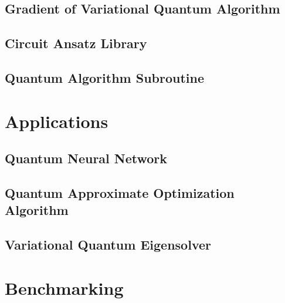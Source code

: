 \documentclass[pra,twocolumn,superscriptaddress,floatfix,nofootinbib,amsmath,amssymb]{revtex4-1}
\numberwithin{equation}{section}
\numberwithin{figure}{section}
\numberwithin{table}{section}
\begin{document}
\subsection{Gradient of Variational Quantum Algorithm}


\subsection{Circuit Ansatz Library}


\subsection{Quantum Algorithm Subroutine}



\section{Applications}
\label{sec:applications}
\subsection{Quantum Neural Network}








\subsection{Quantum Approximate Optimization Algorithm}


\subsection{Variational Quantum Eigensolver}





\section{Benchmarking}
\label{sec:benchmark}
\end{document}
